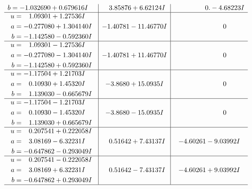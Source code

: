 \documentclass[1p]{elsarticle_modified}
\theoremstyle{definition}
\begin{document}
$$\begin{array}{c|c|c}
\begin{aligned}
b &= -1.032690 + 0.679616 I\end{aligned}
 & \phantom{-}3.85876 + 6.62124 I & \phantom{-0.000000 } 0. - 4.68223 I \\ \hline\begin{aligned}
u &= \phantom{-}1.09301 + 1.27536 I \\
a &= -0.277080 + 1.304140 I \\
b &= -1.142580 - 0.592360 I\end{aligned}
 & -1.40781 - 11.46770 I & \phantom{-0.000000 } 0 \\ \hline\begin{aligned}
u &= \phantom{-}1.09301 - 1.27536 I \\
a &= -0.277080 - 1.304140 I \\
b &= -1.142580 + 0.592360 I\end{aligned}
 & -1.40781 + 11.46770 I & \phantom{-0.000000 } 0 \\ \hline\begin{aligned}
u &= -1.17504 + 1.21703 I \\
a &= \phantom{-}0.10930 + 1.45320 I \\
b &= \phantom{-}1.139030 - 0.665679 I\end{aligned}
 & -3.8680 + 15.0935 I & \phantom{-0.000000 } 0 \\ \hline\begin{aligned}
u &= -1.17504 - 1.21703 I \\
a &= \phantom{-}0.10930 - 1.45320 I \\
b &= \phantom{-}1.139030 + 0.665679 I\end{aligned}
 & -3.8680 - 15.0935 I & \phantom{-0.000000 } 0 \\ \hline\begin{aligned}
u &= \phantom{-}0.207541 + 0.222058 I \\
a &= \phantom{-}3.08169 - 6.32231 I \\
b &= -0.647862 - 0.293049 I\end{aligned}
 & \phantom{-}0.51642 + 7.43137 I & -4.60261 - 9.03992 I \\ \hline\begin{aligned}
u &= \phantom{-}0.207541 - 0.222058 I \\
a &= \phantom{-}3.08169 + 6.32231 I \\
b &= -0.647862 + 0.293049 I\end{aligned}
 & \phantom{-}0.51642 - 7.43137 I & -4.60261 + 9.03992 I\\
 \hline 
 \end{array}$$\newpage$$\begin{array}{c|c|c}  

\end{array}$$
\end{document}
